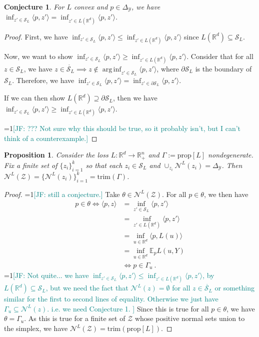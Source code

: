 \documentclass[11pt]{article}
\newcommand{\Comments}{1}
\newcommand{\mynote}[2]{\ifnum\Comments=1\textcolor{#1}{#2}\fi}
\newcommand{\jessie}[1]{\mynote{teal}{[JF: #1]}}
\newcommand{\reals}{\mathbb{R}}
\newcommand{\prop}[1]{\mathrm{prop}[#1]}
\newcommand{\simplex}{\Delta_\Y}
\newcommand{\E}{\mathbb{E}}
\newcommand{\N}{\mathcal{N}}
\newcommand{\Sc}{\mathcal{S}}
\newcommand{\Y}{\mathcal{Y}}
\newcommand{\inprod}[2]{\langle #1, #2 \rangle}%
\newcommand{\inter}[1]{\mathring{#1}}%
\newcommand{\trim}{\mathrm{trim}}
\DeclareMathOperator*{\arginf}{arg\,inf}
\newtheorem{proposition}{Proposition}
\newtheorem{conjecture}{Conjecture}
\begin{document}
\begin{conjecture}
	For $L$ convex and $p \in \simplex$, we have $\inf_{z' \in \Sc_L} \inprod{p}{z'} = \inf_{z' \in L(\reals^d)}\inprod{p}{z'}$.
\end{conjecture}
\begin{proof}
	First, we have $\inf_{z' \in \Sc_L} \inprod{p}{z'} \leq \inf_{z' \in L(\reals^d)}\inprod{p}{z'}$ since $L(\reals^d) \subseteq \Sc_L$.
	
	Now, we want to show $\inf_{z' \in \Sc_L} \inprod{p}{z'} \geq \inf_{z' \in L(\reals^d)}\inprod{p}{z'}$.
	Consider that for all $z \in \Sc_L$, we have $z \in \inter{\Sc_L} \implies z \not \in \arginf_{z' \in \Sc_L}\inprod{p}{z'}$, where $\partial \Sc_L$ is the boundary of $\Sc_L$.
	Therefore, we have $\inf_{z' \in \Sc_L}\inprod{p}{z'} = \inf_{z' \in \partial\Sc_L}\inprod{p}{z'}$.
	
	If we can then show $L(\reals^d) \supseteq \partial \Sc_L$, then we have $\inf_{z' \in \Sc_L} \inprod{p}{z'} \geq \inf_{z' \in L(\reals^d)}\inprod{p}{z'}$.

	\jessie{??? Not sure why this should be true, so it probably isn't, but I can't think of a counterexample.}
\end{proof}

\begin{proposition}
	Consider the loss $L:\reals^d \to \reals^n_+$ and $\Gamma := \prop{L}$ nondegenerate.
	Fix a finite set of $\{z_i\}_{i=1}^k$ so that each $z_i \in \Sc_L$ and $\cup_{z_i} \N^L(z_i) = \simplex$.
	Then $\N^L(\mathcal{Z}) = \{\N^L(z_i)\}_{i=1}^k = \trim(\Gamma)$.
\end{proposition}
\begin{proof}
  \jessie{still a conjecture.}
  Take $\theta \in \N^L(\mathcal{Z})$.
  For all $p \in \theta$, we then have 
  \begin{align*}
  p \in \theta \iff \inprod{p}{z} &= \inf_{z' \in \Sc_L} \inprod{p}{z'}\\
  &= \inf_{z' \in L(\reals^d)} \inprod{p}{z'}\\
  &= \inf_{u \in \reals^d} \inprod{p}{L(u)}\\
  &= \inf_{u\in \reals^d} \E_p L(u, Y)\\
  &\iff p \in \Gamma_u~.~
  \end{align*}
  \jessie{Not quite... we have $\inf_{z' \in \Sc_L} \inprod{p}{z'} \leq \inf_{z' \in L(\reals^d)} \inprod{p}{z'}$, by $L(\reals^d) \subseteq \Sc_L$, but we need the fact that $\N^L(z) = \emptyset$ for all $z \in \inter{\Sc_L}$ or something similar for the first to second lines of equality.  Otherwise we just have $\Gamma_u \subseteq \N^L(z)$.  i.e. we need Conjecture 1.
  }
  Since this is true for all $p \in \theta$, we have $\theta = \Gamma_u$.
  As this is true for a finite set of $\mathcal{Z}$ whose positive normal sets union to the simplex, we have $\N^L(\mathcal{Z}) = \trim(\prop{L})$.
\end{proof}
\end{document}
